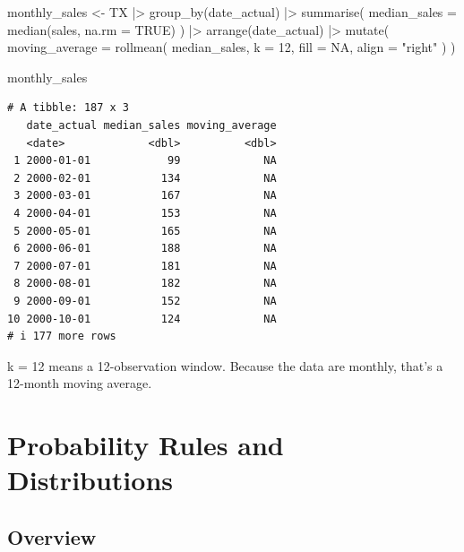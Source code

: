 \documentclass[
  letterpaper,
  DIV=11,
  numbers=noendperiod]{scrreprt}
\newenvironment{Shaded}{\begin{snugshade}}{\end{snugshade}}
\newcommand{\AttributeTok}[1]{\textcolor[rgb]{0.40,0.45,0.13}{#1}}
\newcommand{\ConstantTok}[1]{\textcolor[rgb]{0.56,0.35,0.01}{#1}}
\newcommand{\DecValTok}[1]{\textcolor[rgb]{0.68,0.00,0.00}{#1}}
\newcommand{\FunctionTok}[1]{\textcolor[rgb]{0.28,0.35,0.67}{#1}}
\newcommand{\NormalTok}[1]{\textcolor[rgb]{0.00,0.23,0.31}{#1}}
\newcommand{\OtherTok}[1]{\textcolor[rgb]{0.00,0.23,0.31}{#1}}
\newcommand{\SpecialCharTok}[1]{\textcolor[rgb]{0.37,0.37,0.37}{#1}}
\newcommand{\StringTok}[1]{\textcolor[rgb]{0.13,0.47,0.30}{#1}}
\begin{document}
\begin{Shaded}
\begin{Highlighting}[]
\NormalTok{monthly\_sales }\OtherTok{\textless{}{-}}\NormalTok{ TX }\SpecialCharTok{|\textgreater{}}
    \FunctionTok{group\_by}\NormalTok{(date\_actual) }\SpecialCharTok{|\textgreater{}}
    \FunctionTok{summarise}\NormalTok{(}
        \AttributeTok{median\_sales =} \FunctionTok{median}\NormalTok{(sales, }\AttributeTok{na.rm =} \ConstantTok{TRUE}\NormalTok{)}
\NormalTok{    ) }\SpecialCharTok{|\textgreater{}}
    \FunctionTok{arrange}\NormalTok{(date\_actual) }\SpecialCharTok{|\textgreater{}}
    \FunctionTok{mutate}\NormalTok{(}
        \AttributeTok{moving\_average =} \FunctionTok{rollmean}\NormalTok{(}
\NormalTok{            median\_sales,}
            \AttributeTok{k =} \DecValTok{12}\NormalTok{,}
            \AttributeTok{fill =} \ConstantTok{NA}\NormalTok{,}
            \AttributeTok{align =} \StringTok{"right"}
\NormalTok{        )}
\NormalTok{    )}

\NormalTok{monthly\_sales}
\end{Highlighting}
\end{Shaded}

\begin{verbatim}
# A tibble: 187 x 3
   date_actual median_sales moving_average
   <date>             <dbl>          <dbl>
 1 2000-01-01            99             NA
 2 2000-02-01           134             NA
 3 2000-03-01           167             NA
 4 2000-04-01           153             NA
 5 2000-05-01           165             NA
 6 2000-06-01           188             NA
 7 2000-07-01           181             NA
 8 2000-08-01           182             NA
 9 2000-09-01           152             NA
10 2000-10-01           124             NA
# i 177 more rows
\end{verbatim}

k = 12 means a 12-observation window. Because the data are monthly,
that's a 12-month moving average.


\chapter{Probability Rules and
Distributions}\label{probability-rules-and-distributions}

\section{Overview}\label{overview-3}
\end{document}
